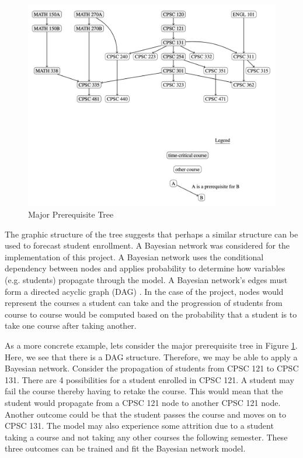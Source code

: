 \documentclass[12pt]{article}
\begin{document}
\begin{figure}[h]
    \centering
    \includegraphics[scale=0.45]{CS_general_courses}
    \caption{Major Prerequisite Tree}
    \label{fig:fig4}
\end{figure}

The graphic structure of the tree suggests that perhaps a similar structure can be used to forecast student
enrollment. A Bayesian network was considered for the implementation of this project. A Bayesian network 
uses the conditional dependency between nodes and applies probability to determine how variables
(e.g. students) propagate through the model. A Bayesian network's edges must form a directed acyclic 
graph (DAG) \cite{needham2007primer}. In the case of the project, nodes would represent the courses a 
student can take and the progression of students from course to course would be computed based on the 
probability that a student is to take one course after taking another. 

As a more concrete example, lets consider the major prerequisite tree in Figure \ref{fig:fig4}. Here, we 
see that there is a DAG structure. Therefore, we may be able to apply a Bayesian network. Consider the 
propagation of students from CPSC 121 to CPSC 131. There are 4 possibilities for a student enrolled in 
CPSC 121. A student may fail the course thereby having to retake the course. This would mean that the 
student would propagate from a CPSC 121 node to another CPSC 121 node. Another outcome could be 
that the student passes the course and moves on to CPSC 131. The model may also experience some 
attrition due to a student taking a course and not taking any other courses the following semester. These
three outcomes can be trained and fit the Bayesian network model. 
\end{document}
